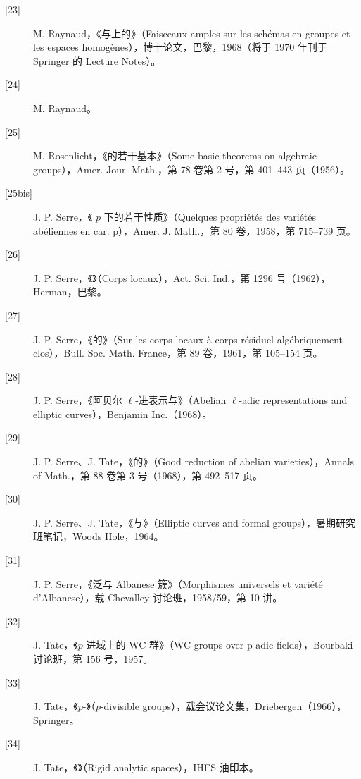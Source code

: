 \begin{description}
\item[{[23]}] M. Raynaud，《与上的》（Faisceaux amples sur les schémas en groupes et les espaces homogènes），博士论文，巴黎，1968（将于 1970 年刊于 Springer 的 Lecture Notes）。
\item[{[24]}] M. Raynaud。
\item[{[25]}] M. Rosenlicht，《的若干基本》（Some basic theorems on algebraic groups），Amer. Jour. Math.，第 78 卷第 2 号，第 401--443 页（1956）。
\item[{[25bis]}] J. P. Serre，《 $p$ 下的若干性质》（Quelques propriétés des variétés abéliennes en car. p），Amer. J. Math.，第 80 卷，1958，第 715--739 页。
\item[{[26]}] J. P. Serre，《》（Corps locaux），Act. Sci. Ind.，第 1296 号（1962），Herman，巴黎。
\item[{[27]}] J. P. Serre，《的》（Sur les corps locaux à corps résiduel algébriquement clos），Bull. Soc. Math. France，第 89 卷，1961，第 105--154 页。
\item[{[28]}] J. P. Serre，《阿贝尔 $\ell$-进表示与》（Abelian $\ell$-adic representations and elliptic curves），Benjamin Inc.（1968）。
\item[{[29]}] J. P. Serre、J. Tate，《的》（Good reduction of abelian varieties），Annals of Math.，第 88 卷第 3 号（1968），第 492--517 页。
\item[{[30]}] J. P. Serre、J. Tate，《与》（Elliptic curves and formal groups），暑期研究班笔记，Woods Hole，1964。
\item[{[31]}] J. P. Serre，《泛与 Albanese 簇》（Morphismes universels et variété d'Albanese），载 Chevalley 讨论班，1958/59，第 10 讲。
\item[{[32]}] J. Tate，《$p$-进域上的 WC 群》（WC-groups over p-adic fields），Bourbaki 讨论班，第 156 号，1957。
\item[{[33]}] J. Tate，《$p$-》（$p$-divisible groups），载会议论文集，Driebergen（1966），Springer。
\item[{[34]}] J. Tate，《》（Rigid analytic spaces），IHES 油印本。
\end{description}
